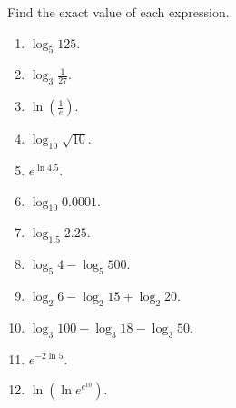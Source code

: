 Find the exact value of each expression.
\begin{multicols}{2}
\begin{enumerate}
\item $\displaystyle \log_5 125$. 

\item $\displaystyle \log_3 \frac{1}{27}$. 

\item $\displaystyle \ln \left(\frac{1}{e}\right) $. 

\item $\displaystyle \log_{10}\sqrt{10}$. 

\item $\displaystyle e^{\ln 4.5}$.  

\item $\displaystyle \log_{10} 0.0001 $.  

\item $\displaystyle \log_{1.5}2.25$.  

\item $\displaystyle \log_5 4- \log_5 500$.  

\item $\displaystyle \log_2 6 - \log_2 15 +\log_2 20$. 

\item $\displaystyle \log_3 100- \log_3 18 - \log _3 50 $.  

\item $\displaystyle e^{-2\ln 5}$.  

\item $\displaystyle \ln \left(\ln e^{e^{10}}\right)$. 

\end{enumerate}
\end{multicols}